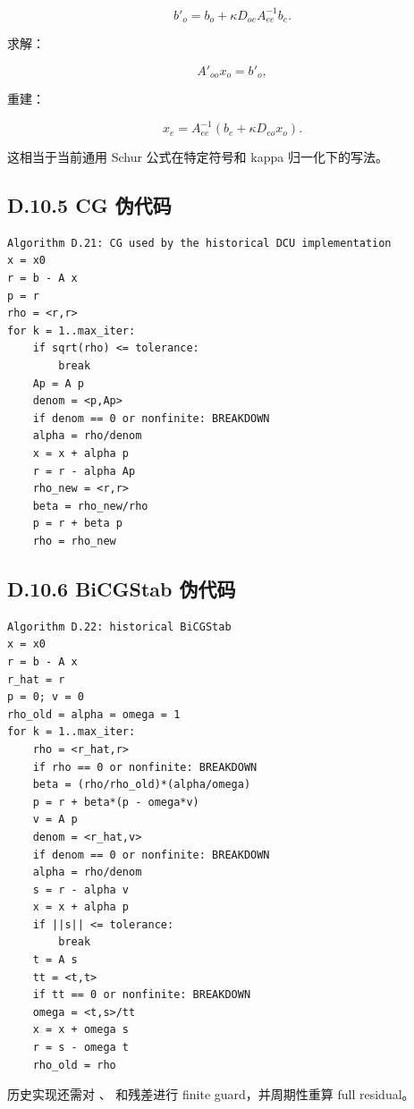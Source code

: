 \documentclass[UTF8,a4paper,10pt]{ctexart}
\DeclareRobustCommand{\pycode}[1]{\texorpdfstring{\texttt{\seqsplit{#1}}}{#1}}
\begin{document}
\begin{displaymath}
b'_o=b_o+\kappa D_{oe}A_{ee}^{-1}b_e.
\end{displaymath}

求解：

\begin{displaymath}
A'_{oo}x_o=b'_o,
\end{displaymath}

重建：

\begin{displaymath}
x_e=A_{ee}^{-1}(b_e+\kappa D_{eo}x_o).
\end{displaymath}

这相当于当前通用 Schur 公式在特定符号和 kappa 归一化下的写法。

\subsection{D.10.5 CG 伪代码}
\begin{Verbatim}[breaklines=true,breakanywhere=true,fontsize=\scriptsize]
Algorithm D.21: CG used by the historical DCU implementation
x = x0
r = b - A x
p = r
rho = <r,r>
for k = 1..max_iter:
    if sqrt(rho) <= tolerance:
        break
    Ap = A p
    denom = <p,Ap>
    if denom == 0 or nonfinite: BREAKDOWN
    alpha = rho/denom
    x = x + alpha p
    r = r - alpha Ap
    rho_new = <r,r>
    beta = rho_new/rho
    p = r + beta p
    rho = rho_new
\end{Verbatim}
\subsection{D.10.6 BiCGStab 伪代码}
\begin{Verbatim}[breaklines=true,breakanywhere=true,fontsize=\scriptsize]
Algorithm D.22: historical BiCGStab
x = x0
r = b - A x
r_hat = r
p = 0; v = 0
rho_old = alpha = omega = 1
for k = 1..max_iter:
    rho = <r_hat,r>
    if rho == 0 or nonfinite: BREAKDOWN
    beta = (rho/rho_old)*(alpha/omega)
    p = r + beta*(p - omega*v)
    v = A p
    denom = <r_hat,v>
    if denom == 0 or nonfinite: BREAKDOWN
    alpha = rho/denom
    s = r - alpha v
    x = x + alpha p
    if ||s|| <= tolerance:
        break
    t = A s
    tt = <t,t>
    if tt == 0 or nonfinite: BREAKDOWN
    omega = <t,s>/tt
    x = x + omega s
    r = s - omega t
    rho_old = rho
\end{Verbatim}
历史实现还需对 \pycode{rho}、\pycode{omega} 和残差进行 finite guard，并周期性重算 full residual。
\end{document}
